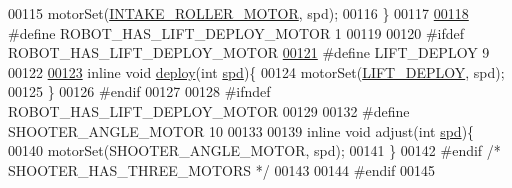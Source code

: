 \begin{DoxyCode}
00115     motorSet(\hyperlink{motors_8h_a8ac783dc4e09804d3b2f7e3b6bbecad7}{INTAKE\_ROLLER\_MOTOR}, spd);
00116 \}
00117 
\hypertarget{motors_8h_source.tex_l00118}{}\hyperlink{motors_8h_a1764b7462fb0a7e34cc39a48f15422ca}{00118} \textcolor{preprocessor}{#define ROBOT\_HAS\_LIFT\_DEPLOY\_MOTOR 1}
00119 
00120 \textcolor{preprocessor}{#ifdef ROBOT\_HAS\_LIFT\_DEPLOY\_MOTOR}
\hypertarget{motors_8h_source.tex_l00121}{}\hyperlink{motors_8h_a9e703840acb5657339f59982914dffb7}{00121} \textcolor{preprocessor}{#define LIFT\_DEPLOY 9}
00122 
\hypertarget{motors_8h_source.tex_l00123}{}\hyperlink{motors_8h_af9cae4c2a660189553e6c8e51e371913}{00123} \textcolor{keyword}{inline} \textcolor{keywordtype}{void} \hyperlink{motors_8h_af9cae4c2a660189553e6c8e51e371913}{deploy}(\textcolor{keywordtype}{int} \hyperlink{opcontrol_8c_a642ce334330c8b0f6e33dd0a3fa65111}{spd})\{
00124     motorSet(\hyperlink{motors_8h_a9e703840acb5657339f59982914dffb7}{LIFT\_DEPLOY}, spd);
00125 \}
00126 \textcolor{preprocessor}{#endif}
00127 
00128 \textcolor{preprocessor}{#ifndef ROBOT\_HAS\_LIFT\_DEPLOY\_MOTOR}
00129 
00132 \textcolor{preprocessor}{#define SHOOTER\_ANGLE\_MOTOR 10}
00133 
00139 \textcolor{keyword}{inline} \textcolor{keywordtype}{void} adjust(\textcolor{keywordtype}{int} \hyperlink{opcontrol_8c_a642ce334330c8b0f6e33dd0a3fa65111}{spd})\{
00140     motorSet(SHOOTER\_ANGLE\_MOTOR, spd);
00141 \}
00142 \textcolor{preprocessor}{#endif }\textcolor{comment}{/* SHOOTER\_HAS\_THREE\_MOTORS */}\textcolor{preprocessor}{}
00143 
00144 \textcolor{preprocessor}{#endif}
00145 
\end{DoxyCode}
